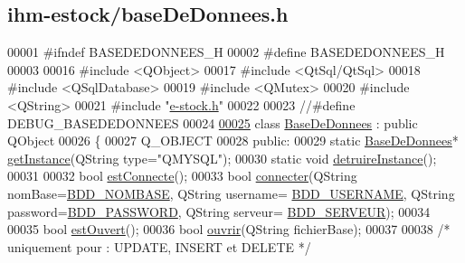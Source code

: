 \hypertarget{ihm-estock_2base_de_donnees_8h_source}{}\subsection{ihm-\/estock/base\+De\+Donnees.h}
\label{ihm-estock_2base_de_donnees_8h_source}

\begin{DoxyCode}
00001 \textcolor{preprocessor}{#ifndef BASEDEDONNEES\_H}
00002 \textcolor{preprocessor}{#define BASEDEDONNEES\_H}
00003 
00016 \textcolor{preprocessor}{#include <QObject>}
00017 \textcolor{preprocessor}{#include <QtSql/QtSql>}
00018 \textcolor{preprocessor}{#include <QSqlDatabase>}
00019 \textcolor{preprocessor}{#include <QMutex>}
00020 \textcolor{preprocessor}{#include <QString>}
00021 \textcolor{preprocessor}{#include "\hyperlink{e-stock_8h}{e-stock.h}"}
00022 
00023 \textcolor{comment}{//#define DEBUG\_BASEDEDONNEES}
00024 
\hyperlink{class_base_de_donnees}{00025} \textcolor{keyword}{class }\hyperlink{class_base_de_donnees}{BaseDeDonnees} : \textcolor{keyword}{public} QObject
00026 \{
00027     Q\_OBJECT
00028     \textcolor{keyword}{public}:
00029         \textcolor{keyword}{static} \hyperlink{class_base_de_donnees}{BaseDeDonnees}* \hyperlink{class_base_de_donnees_a80028aa2b6b4fbf30fb2e36357b7d3d3}{getInstance}(QString type=\textcolor{stringliteral}{"QMYSQL"});
00030         \textcolor{keyword}{static} \textcolor{keywordtype}{void} \hyperlink{class_base_de_donnees_a457401c0816b888c77ce915997545f4e}{detruireInstance}();
00031 
00032         \textcolor{keywordtype}{bool} \hyperlink{class_base_de_donnees_a00388973f3ec42e5c8e76e7af7e124b2}{estConnecte}();
00033         \textcolor{keywordtype}{bool} \hyperlink{class_base_de_donnees_ac20da193923a9bfea5e38ee5a54820cd}{connecter}(QString nomBase=\hyperlink{e-stock_8h_a45f8f15b8f9a7ab4c2b219038ff64f6b}{BDD\_NOMBASE}, QString username=
      \hyperlink{e-stock_8h_a88b5f5b81fa534553c68802384beff2c}{BDD\_USERNAME}, QString password=\hyperlink{e-stock_8h_ae2ded9166ed2553182545e97514c04f7}{BDD\_PASSWORD}, QString serveur=
      \hyperlink{e-stock_8h_a423559dc987673b8aacaa9f369839bb0}{BDD\_SERVEUR});
00034         
00035         \textcolor{keywordtype}{bool} \hyperlink{class_base_de_donnees_af9ac332082ffd0dd35e412cefabe5e9c}{estOuvert}();
00036         \textcolor{keywordtype}{bool} \hyperlink{class_base_de_donnees_a7f6a5510b08017b0d99115a84252f186}{ouvrir}(QString fichierBase);
00037 
00038         \textcolor{comment}{/* uniquement pour : UPDATE, INSERT et DELETE */}

\end{DoxyCode}
